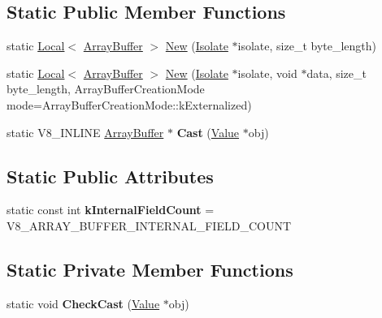 \subsection*{Static Public Member Functions}
\begin{DoxyCompactItemize}
\item 
static \hyperlink{classv8_1_1_local}{Local}$<$ \hyperlink{classv8_1_1_array_buffer}{Array\+Buffer} $>$ \hyperlink{classv8_1_1_array_buffer_ad752e03d7cc7fe863656ad6183785ab7}{New} (\hyperlink{classv8_1_1_isolate}{Isolate} $\ast$isolate, size\+\_\+t byte\+\_\+length)
\item 
static \hyperlink{classv8_1_1_local}{Local}$<$ \hyperlink{classv8_1_1_array_buffer}{Array\+Buffer} $>$ \hyperlink{classv8_1_1_array_buffer_acc65e714766b0d0d791b0d43ec52d0bb}{New} (\hyperlink{classv8_1_1_isolate}{Isolate} $\ast$isolate, void $\ast$data, size\+\_\+t byte\+\_\+length, Array\+Buffer\+Creation\+Mode mode=Array\+Buffer\+Creation\+Mode\+::k\+Externalized)
\item 
static V8\+\_\+\+I\+N\+L\+I\+NE \hyperlink{classv8_1_1_array_buffer}{Array\+Buffer} $\ast$ {\bfseries Cast} (\hyperlink{classv8_1_1_value}{Value} $\ast$obj)\hypertarget{classv8_1_1_array_buffer_a4b0a703ae34217507a8ebc9cabf7336a}{}\label{classv8_1_1_array_buffer_a4b0a703ae34217507a8ebc9cabf7336a}

\end{DoxyCompactItemize}
\subsection*{Static Public Attributes}
\begin{DoxyCompactItemize}
\item 
static const int {\bfseries k\+Internal\+Field\+Count} = V8\+\_\+\+A\+R\+R\+A\+Y\+\_\+\+B\+U\+F\+F\+E\+R\+\_\+\+I\+N\+T\+E\+R\+N\+A\+L\+\_\+\+F\+I\+E\+L\+D\+\_\+\+C\+O\+U\+NT\hypertarget{classv8_1_1_array_buffer_af49000a2ea120e49da846ef02a42ac69}{}\label{classv8_1_1_array_buffer_af49000a2ea120e49da846ef02a42ac69}

\end{DoxyCompactItemize}
\subsection*{Static Private Member Functions}
\begin{DoxyCompactItemize}
\item 
static void {\bfseries Check\+Cast} (\hyperlink{classv8_1_1_value}{Value} $\ast$obj)\hypertarget{classv8_1_1_array_buffer_af22a450a92f781cbf0dbac30ac560a3c}{}\label{classv8_1_1_array_buffer_af22a450a92f781cbf0dbac30ac560a3c}

\end{DoxyCompactItemize}


